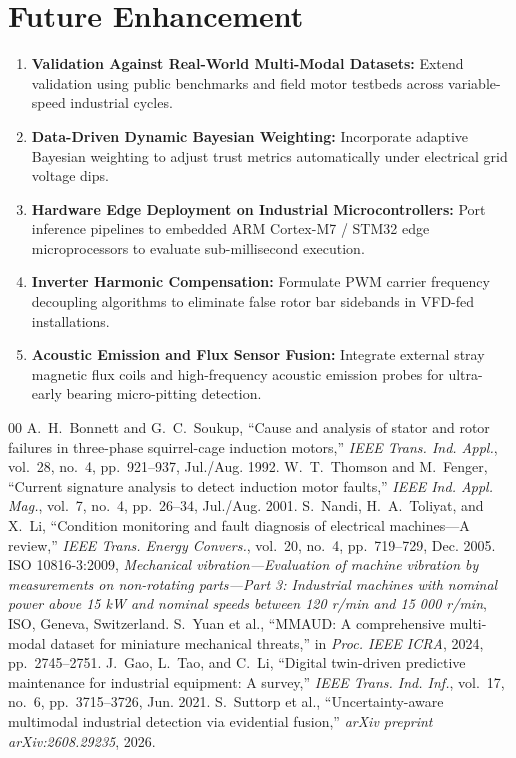 \documentclass[conference]{IEEEtran}
\begin{document}
\section{Future Enhancement}
\begin{enumerate}
    \item \textbf{Validation Against Real-World Multi-Modal Datasets:} Extend validation using public benchmarks and field motor testbeds across variable-speed industrial cycles.
    \item \textbf{Data-Driven Dynamic Bayesian Weighting:} Incorporate adaptive Bayesian weighting to adjust trust metrics automatically under electrical grid voltage dips.
    \item \textbf{Hardware Edge Deployment on Industrial Microcontrollers:} Port inference pipelines to embedded ARM Cortex-M7 / STM32 edge microprocessors to evaluate sub-millisecond execution.
    \item \textbf{Inverter Harmonic Compensation:} Formulate PWM carrier frequency decoupling algorithms to eliminate false rotor bar sidebands in VFD-fed installations.
    \item \textbf{Acoustic Emission and Flux Sensor Fusion:} Integrate external stray magnetic flux coils and high-frequency acoustic emission probes for ultra-early bearing micro-pitting detection.
\end{enumerate}

\begin{thebibliography}{00}
 A.~H.~Bonnett and G.~C.~Soukup, ``Cause and analysis of stator and rotor failures in three-phase squirrel-cage induction motors,'' \emph{IEEE Trans. Ind. Appl.}, vol.~28, no.~4, pp.~921--937, Jul./Aug. 1992.
 W.~T.~Thomson and M.~Fenger, ``Current signature analysis to detect induction motor faults,'' \emph{IEEE Ind. Appl. Mag.}, vol.~7, no.~4, pp.~26--34, Jul./Aug. 2001.
 S.~Nandi, H.~A.~Toliyat, and X.~Li, ``Condition monitoring and fault diagnosis of electrical machines---A review,'' \emph{IEEE Trans. Energy Convers.}, vol.~20, no.~4, pp.~719--729, Dec. 2005.
 ISO 10816-3:2009, \emph{Mechanical vibration---Evaluation of machine vibration by measurements on non-rotating parts---Part 3: Industrial machines with nominal power above 15 kW and nominal speeds between 120 r/min and 15 000 r/min}, ISO, Geneva, Switzerland.
 S.~Yuan et al., ``MMAUD: A comprehensive multi-modal dataset for miniature mechanical threats,'' in \emph{Proc. IEEE ICRA}, 2024, pp.~2745--2751.
 J.~Gao, L.~Tao, and C.~Li, ``Digital twin-driven predictive maintenance for industrial equipment: A survey,'' \emph{IEEE Trans. Ind. Inf.}, vol.~17, no.~6, pp.~3715--3726, Jun. 2021.
 S.~Suttorp et al., ``Uncertainty-aware multimodal industrial detection via evidential fusion,'' \emph{arXiv preprint arXiv:2608.29235}, 2026.
\end{thebibliography}
\end{document}
